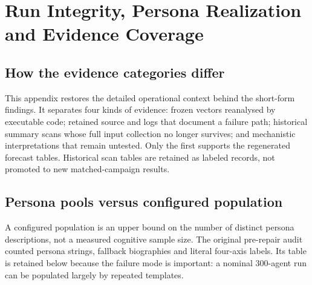 \section{Run Integrity, Persona Realization and Evidence Coverage}
\label{sec:full_campaign_supporting}
\subsection{How the evidence categories differ}
This appendix restores the detailed operational context behind the short-form findings. It separates four kinds of evidence: frozen vectors reanalysed by executable code; retained source and logs that document a failure path; historical summary scans whose full input collection no longer survives; and mechanistic interpretations that remain untested. Only the first supports the regenerated forecast tables. Historical scan tables are retained as labeled records, not promoted to new matched-campaign results.

\subsection{Persona pools versus configured population}
\label{sec:persona_audit}
A configured population is an upper bound on the number of distinct persona descriptions, not a measured cognitive sample size. The original pre-repair audit counted persona strings, fallback biographies and literal four-axis labels. Its table is retained below because the failure mode is important: a nominal 300-agent run can be populated largely by repeated templates.
\begin{table}[!htbp]
\centering
\caption{Historical pre-repair persona-string audit of the three original campaigns. Literal template compliance and distinct strings do not validate cognitive diversity. The Llama row includes subsequently replaced outage records; these are not statistics of its recovered campaign.}
\label{tab:persona_audit}
\footnotesize
\setlength{\tabcolsep}{3pt}
\setlength{\tabcolsep}{6pt}
\end{table}

